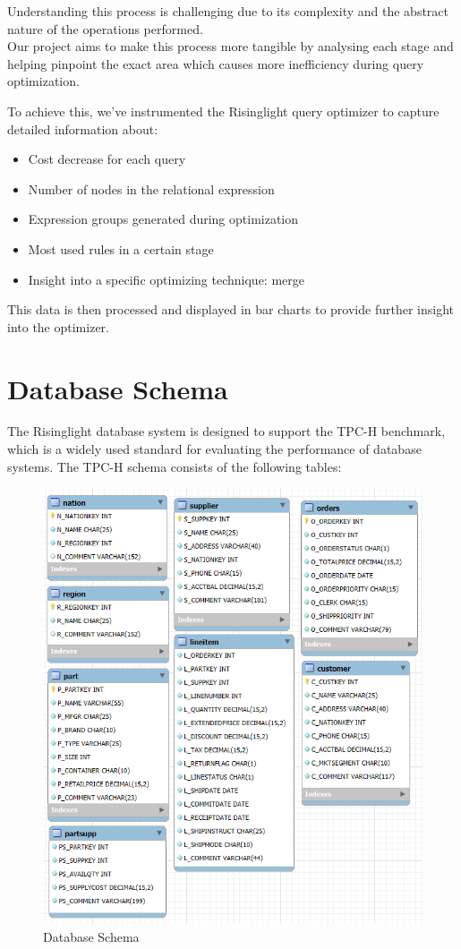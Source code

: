 \documentclass[a4paper,12pt]{scrreprt}
\begin{document}
Understanding this process is challenging due to its complexity and the abstract nature of the operations performed. \\
Our project aims to make this process more tangible by analysing each stage and helping pinpoint the exact area which causes more inefficiency during query optimization.

To achieve this, we've instrumented the Risinglight query optimizer to capture detailed information about:
\begin{itemize}
    \item Cost decrease for each query
    \item Number of nodes in the relational expression
    \item Expression groups generated during optimization
    \item Most used rules in a certain stage
    \item Insight into a specific optimizing technique: merge
\end{itemize}

This data is then processed and displayed in bar charts to provide further insight into the optimizer.

\section{Database Schema}

The Risinglight database system is designed to support the TPC-H benchmark, which is a widely used standard for evaluating the performance of database systems. The TPC-H schema consists of the following tables:
\begin{figure}[H]
    \centering
    \includegraphics[width=0.75\linewidth]{img/image.png}
    \caption{Database Schema}
    \label{fig:database_schema}
\end{figure}
\end{document}

